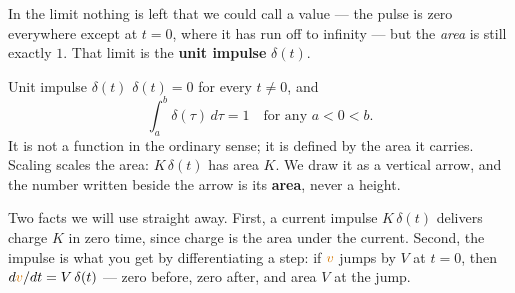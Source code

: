 \documentclass[11pt,a4paper]{article}
\newcommand{\Vcol}[1]{\textcolor{cvolt}{#1}}
\begin{document}
\begin{center}
\end{center}

In the limit nothing is left that we could call a value --- the pulse is zero everywhere
except at $t = 0$, where it has run off to infinity --- but the \emph{area} is still
exactly $1$. That limit is the \textbf{unit impulse} $\delta(t)$.

\begin{definitionbox}{Unit impulse $\delta(t)$}
$\delta(t) = 0$ for every $t \neq 0$, and
\[
  \int_{a}^{b} \delta(\tau)\,d\tau = 1 \quad\text{for any } a < 0 < b .
\]
It is not a function in the ordinary sense; it is defined by the area it carries. Scaling
scales the area: $K\,\delta(t)$ has area $K$. We draw it as a vertical arrow, and the
number written beside the arrow is its \textbf{area}, never a height.
\end{definitionbox}

Two facts we will use straight away. First, a current impulse $K\,\delta(t)$ delivers
charge $K$ in zero time, since charge is the area under the current. Second, the impulse
is what you get by differentiating a step: if $\Vcol{v}$ jumps by $V$ at $t = 0$, then
$d\Vcol{v}/dt = V\,\delta(t)$ --- zero before, zero after, and area $V$ at the jump.
\end{document}
